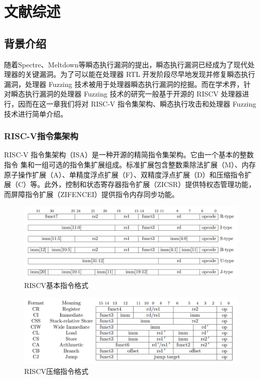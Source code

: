 \cleardoublepage
\newrefsection
\chapter{文献综述}

\section{背景介绍}

随着Spectre\cite{kocher2020spectre}、Meltdown\cite{horn2018meltdown}等瞬态执行漏洞的提出，瞬态执行漏洞已经成为了现代处理器的关键漏洞。为了可以能在处理器 RTL 开发阶段尽早地发现并修复瞬态执行漏洞，处理器 Fuzzing 技术被用于处理器瞬态执行漏洞的挖掘。而在学术界，针对瞬态执行漏洞的处理器 Fuzzing 技术的研究一般基于开源的 RISCV 处理器进行，因而在这一章我们将对 RISC-V 指令集架构、瞬态执行攻击和处理器 Fuzzing 技术进行简单介绍。

\subsection{RISC-V指令集架构}
RISC-V 指令集架构（ISA）是一种开源的精简指令集架构。它由一个基本的整数指令 集和一组可选的指令集扩展组成。标准扩展包含整数乘除法扩展（M）、内存原子操作扩展（A）、单精度浮点扩展（F）、双精度浮点扩展（D）和压缩指令扩展（C）等。此外，控制和状态寄存器指令扩展（ZICSR）提供特权态管理功能， 而屏障指令扩展（ZIFENCEI）提供指令内存同步功能。\par

\begin{figure}[!h]
    \centering
    \includegraphics[width=\linewidth]{figure/proposal/riscv-base-instruct-format.png}
    \caption{RISCV基本指令格式}
    \label{review:base-inst}
\end{figure}
\begin{figure}[!h]
    \centering
    \includegraphics[width=\linewidth]{figure/proposal/riscv-compress-instruct-format.png}
    \caption{RISCV压缩指令格式}
    \label{review:compress-inst}
\end{figure}

